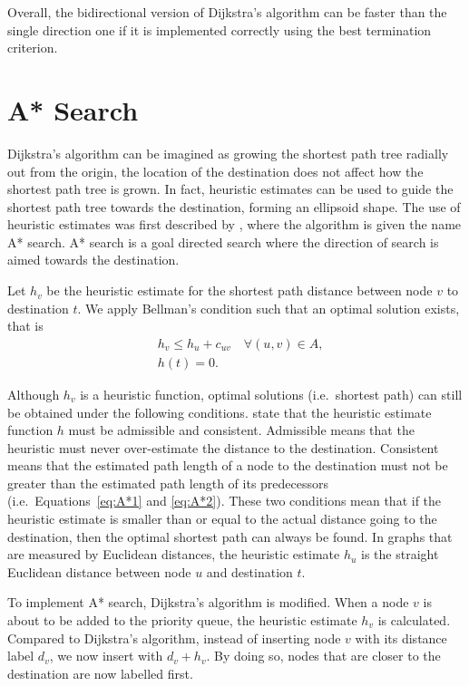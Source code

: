 Overall, the bidirectional version of Dijkstra's algorithm can be faster than the single direction one if it is implemented correctly using the best termination criterion.

\section{A* Search}\label{section:A*}
Dijkstra's algorithm can be imagined as growing the shortest path tree radially out from the origin,
the location of the destination does not affect how the shortest path tree is grown.
In fact, heuristic estimates can be used to guide the shortest path tree towards the destination,
forming an ellipsoid shape.
The use of heuristic estimates was first described by \citet{Astar},
where the algorithm is given the name A* search.
A* search is a goal directed search where the direction of search is aimed towards the destination.


Let $h_v$ be the heuristic estimate for the shortest path distance between node $v$ to destination $t$.
We apply Bellman's condition such that an optimal solution exists, that is 
\begin{align}
    &h_v \leq h_u + c_{uv} \quad \forall(u,v) \in A, \label{eq:A*1}\\
    &h(t) = 0. \label{eq:A*2}
\end{align}

Although $h_v$ is a heuristic function,
optimal solutions (i.e.\ shortest path) can still be obtained under the following conditions.
\citet{Astar} state that the heuristic estimate function $h$ must be admissible and consistent.
Admissible means that the heuristic must never over-estimate the distance to the destination.
Consistent means that the estimated path length of a node to the destination must not be greater than the estimated path length of its predecessors (i.e.\ Equations~\eqref{eq:A*1} and \eqref{eq:A*2}).
These two conditions mean that 
if the heuristic estimate is smaller than or equal to the actual distance going to the destination,
then the optimal shortest path can always be found. 
In graphs that are measured by Euclidean distances,
the heuristic estimate $h_u$ is the straight Euclidean distance between node $u$ and destination $t$.

%
To implement A* search,
Dijkstra's algorithm is modified.
When a node $v$ is about to be added to the priority queue,
the heuristic estimate $h_v$ is calculated.
Compared to Dijkstra's algorithm,
instead of inserting node $v$ with its distance label $d_v$,
we now insert with $d_v + h_v$.
By doing so,
nodes that are closer to the destination are now labelled first.

